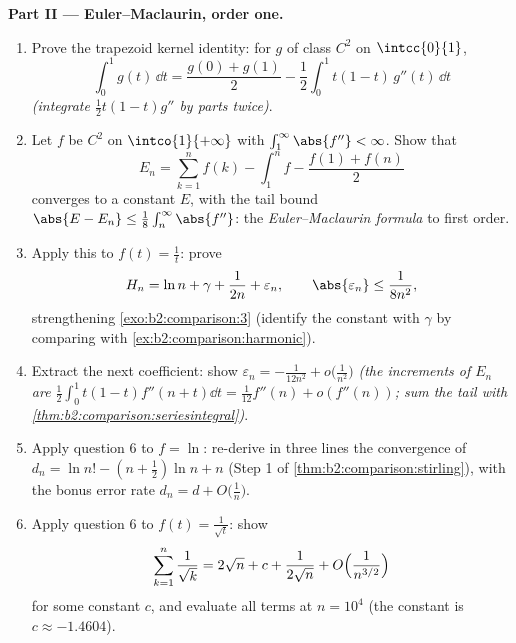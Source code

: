 \begin{problem}
\medskip
\noindent\textbf{Part II --- Euler--Maclaurin, order one.}
\begin{enumerate}[resume]
  \item Prove the trapezoid kernel identity: for $g$ of class
        $C^2$ on $\intcc{0}{1}$,
        \[
        \int_0^1 g(t)\,\dd t = \frac{g(0) + g(1)}{2}
        - \frac12\int_0^1 t(1 - t)\,g''(t)\,\dd t
        \]
        \emph{(integrate $\frac12 t(1-t)g''$ by parts twice)}.
  \item Let $f$ be $C^2$ on $\intco{1}{+\infty}$ with
        $\int_1^\infty \abs{f''} < \infty$. Show that
        \[
        E_n = \sum_{k=1}^{n} f(k) - \int_1^n f -
        \frac{f(1) + f(n)}{2}
        \]
        converges to a constant $E$, with the tail bound
        $\abs{E - E_n} \leq \frac18\int_n^\infty\abs{f''}$: the
        \emph{Euler--Maclaurin formula} to first order.
  \item Apply this to $f(t) = \frac1t$: prove
        \[
        H_n = \ln n + \gamma + \frac{1}{2n} + \varepsilon_n,
        \qquad \abs{\varepsilon_n} \leq \frac{1}{8n^2},
        \]
        strengthening \cref{exo:b2:comparison:3} (identify the
        constant with $\gamma$ by comparing with
        \cref{ex:b2:comparison:harmonic}).
  \item Extract the next coefficient: show $\varepsilon_n =
        -\frac{1}{12n^2} + o\bigl(\frac1{n^2}\bigr)$
        \emph{(the increments of $E_n$ are
        $\frac12\int_0^1t(1-t)f''(n+t)\dd t =
        \frac1{12}f''(n) + o(f''(n))$; sum the tail with
        \cref{thm:b2:comparison:seriesintegral})}.
  \item Apply question 6 to $f = \ln$: re-derive in three lines
        the convergence of $d_n = \ln n! - (n +
        \frac12)\ln n + n$ (Step 1 of
        \cref{thm:b2:comparison:stirling}), with the bonus error
        rate $d_n = d + O\bigl(\frac1n\bigr)$.
  \item Apply question 6 to $f(t) = \frac{1}{\sqrt t}$: show
        \[
        \sum_{k=1}^{n}\frac1{\sqrt k} = 2\sqrt n + c +
        \frac{1}{2\sqrt n} + O\Bigl(\frac{1}{n^{3/2}}\Bigr)
        \]
        for some constant $c$, and evaluate all terms at $n =
        10^4$ (the constant is $c \approx -1.4604$).
\end{enumerate}


\end{problem}
